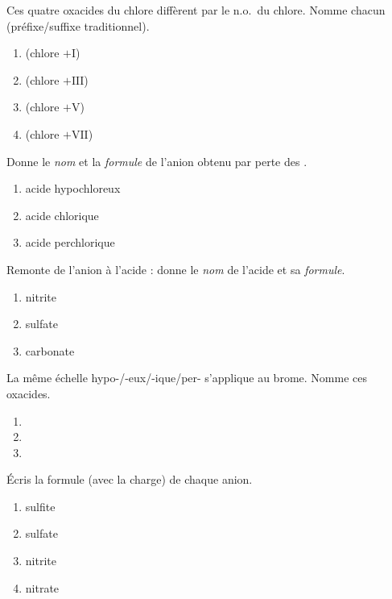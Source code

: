 \documentclass[11pt,a4paper]{article}
\begin{document}
\begin{exo}
Ces quatre oxacides du chlore diffèrent par le n.o.\ du chlore. Nomme chacun (préfixe/suffixe traditionnel).
\begin{enumerate}[label=\alph*)]
  \item {} (chlore $+\mathrm{I}$)
  \item {} (chlore $+\mathrm{III}$)
  \item {} (chlore $+\mathrm{V}$)
  \item {} (chlore $+\mathrm{VII}$)
\end{enumerate}
\end{exo}

\begin{exo}
Donne le \emph{nom} et la \emph{formule} de l'anion obtenu par perte des .
\begin{enumerate}[label=\alph*)]
  \item acide hypochloreux 
  \item acide chlorique 
  \item acide perchlorique 
\end{enumerate}
\end{exo}

\begin{exo}
Remonte de l'anion à l'acide : donne le \emph{nom} de l'acide et sa \emph{formule}.
\begin{enumerate}[label=\alph*)]
  \item nitrite 
  \item sulfate 
  \item carbonate 
\end{enumerate}
\end{exo}

\begin{exo}
La même échelle hypo-/-eux/-ique/per- s'applique au brome. Nomme ces oxacides.
\begin{enumerate}[label=\alph*)]
  \item {}
  \item {}
  \item {}
\end{enumerate}
\end{exo}

\begin{exo}
Écris la formule (avec la charge) de chaque anion.
\begin{enumerate}[label=\alph*)]
  \item sulfite
  \item sulfate
  \item nitrite
  \item nitrate
\end{enumerate}
\end{exo}
\end{document}
